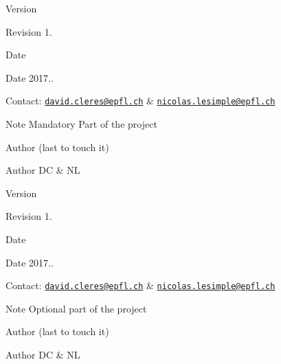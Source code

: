 \begin{DoxyVersion}{Version}

\end{DoxyVersion}
\begin{DoxyParagraph}{Revision}
1. 
\end{DoxyParagraph}


\begin{DoxyDate}{Date}

\end{DoxyDate}
\begin{DoxyParagraph}{Date}
2017.. 
\end{DoxyParagraph}


Contact\+: \href{mailto:david.cleres@epfl.ch}{\tt david.\+cleres@epfl.\+ch} \& \href{mailto:nicolas.lesimple@epfl.ch}{\tt nicolas.\+lesimple@epfl.\+ch}

\begin{DoxyNote}{Note}
Mandatory Part of the project
\end{DoxyNote}
\begin{DoxyAuthor}{Author}
(last to touch it) 
\end{DoxyAuthor}
\begin{DoxyParagraph}{Author}
DC \& NL
\end{DoxyParagraph}


\begin{DoxyVersion}{Version}

\end{DoxyVersion}
\begin{DoxyParagraph}{Revision}
1. 
\end{DoxyParagraph}


\begin{DoxyDate}{Date}

\end{DoxyDate}
\begin{DoxyParagraph}{Date}
2017.. 
\end{DoxyParagraph}


Contact\+: \href{mailto:david.cleres@epfl.ch}{\tt david.\+cleres@epfl.\+ch} \& \href{mailto:nicolas.lesimple@epfl.ch}{\tt nicolas.\+lesimple@epfl.\+ch}

\begin{DoxyNote}{Note}
Optional part of the project
\end{DoxyNote}
\begin{DoxyAuthor}{Author}
(last to touch it) 
\end{DoxyAuthor}
\begin{DoxyParagraph}{Author}
DC \& NL
\end{DoxyParagraph}



